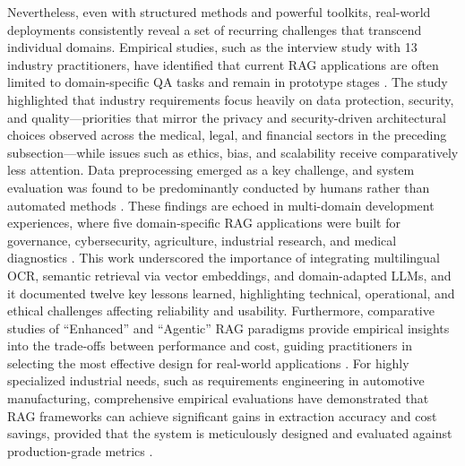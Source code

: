 \documentclass[11pt]{article}
\begin{document}
Nevertheless, even with structured methods and powerful toolkits, real-world deployments consistently reveal a set of recurring challenges that transcend individual domains. Empirical studies, such as the interview study with 13 industry practitioners, have identified that current RAG applications are often limited to domain-specific QA tasks and remain in prototype stages \cite{ref571}. The study highlighted that industry requirements focus heavily on data protection, security, and quality---priorities that mirror the privacy and security-driven architectural choices observed across the medical, legal, and financial sectors in the preceding subsection---while issues such as ethics, bias, and scalability receive comparatively less attention. Data preprocessing emerged as a key challenge, and system evaluation was found to be predominantly conducted by humans rather than automated methods \cite{ref571}. These findings are echoed in multi-domain development experiences, where five domain-specific RAG applications were built for governance, cybersecurity, agriculture, industrial research, and medical diagnostics \cite{ref401}. This work underscored the importance of integrating multilingual OCR, semantic retrieval via vector embeddings, and domain-adapted LLMs, and it documented twelve key lessons learned, highlighting technical, operational, and ethical challenges affecting reliability and usability. Furthermore, comparative studies of ``Enhanced'' and ``Agentic'' RAG paradigms provide empirical insights into the trade-offs between performance and cost, guiding practitioners in selecting the most effective design for real-world applications \cite{ref577}. For highly specialized industrial needs, such as requirements engineering in automotive manufacturing, comprehensive empirical evaluations have demonstrated that RAG frameworks can achieve significant gains in extraction accuracy and cost savings, provided that the system is meticulously designed and evaluated against production-grade metrics \cite{ref567}.
\end{document}
